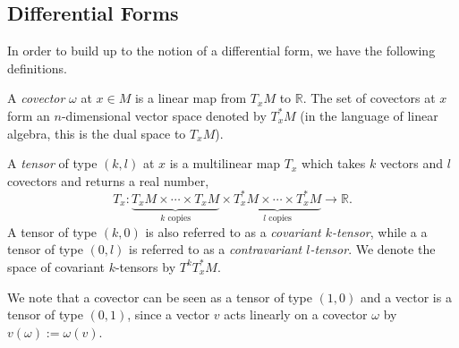 \documentclass[12pt,a4paper]{article}
\begin{document}
\subsection{Differential Forms}
In order to build up to the notion of a differential form, we have the following definitions.
\begin{definition}
A \textit{covector} $\omega$ at $x\in M$ is a linear map from $T_xM$ to $\mathbb{R}$. The set of covectors at $x$ form an $n$-dimensional vector space denoted by $T^*_xM$ (in the language of linear algebra, this is the dual space to $T_xM$).
\end{definition}
\begin{definition}
A \textit{tensor} of type $(k,l)$ at $x$ is a multilinear map $T_x$ which takes $k$ vectors and $l$ covectors and returns a real number,
\[
T_x:\underbrace{T_xM\times\cdots\times T_xM}_{k\text{ copies}}\times\underbrace{T^*_xM\times\cdots\times T^*_xM}_{l\text{ copies}}\to\mathbb{R}.
\]
A tensor of type $(k,0)$ is also referred to as a \textit{covariant $k$-tensor}, while a a tensor of type $(0,l)$ is referred to as a \textit{contravariant $l$-tensor}. We denote the space of covariant $k$-tensors by $T^kT^*_xM$.
\end{definition}
We note that a covector can be seen as a tensor of type $(1,0)$ and a vector is a tensor of type $(0,1)$, since a vector $v$ acts linearly on a covector $\omega$ by $v(\omega):=\omega(v)$.\\
\end{document}
